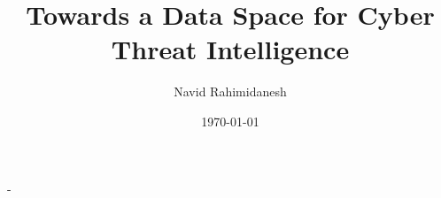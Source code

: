 \begin{titlingpage}
	\newlength{\logoheight}	\setlength{\logoheight}{5cm}
	\setlength{\droptitle}{-3em}
	
	\renewcommand{\maketitlehooka}{%
		\begin{center}
			{\Large  Rheinisch-Westfälische Technische Hochschule Aachen\par\noindent}
			 Informatik 5, Information Systems\\
			Prof. Dr. Stefan Decker\\
			\vspace*{2cm}
			{\LARGE\scshape Master Thesis}
			\vspace*{1.5em}
		\end{center}
	}
	\pretitle{\begin{center}\bfseries\HUGE\color{rwth-75}}
				\title{Towards a Data Space for Cyber Threat Intelligence}
	\posttitle{\end{center}\vskip 4em}
	
	\preauthor{\begin{center}\Large}
		\author{Navid Rahimidanesh}
	\postauthor{\end{center}\vskip 2em}
	
	\predate{\begin{center}\Large}
	\date{\today} %
	\postdate{\end{center}\vskip 2em}

    \renewcommand{\maketitlehookd}{%
    	\vfill
    \centerfloat
    \begin{tabular}{>{\sffamily\color{rwth}}r>{}l}
		\nth{1} Advisor			 &  Mehdi Akbari Gurabi, M.Sc.\\ %
		\nth{2} Advisor			 &  Ömer Sen, M.Sc.\\ %
    	\nth{1} Supervisor		& Prof. Dr. Stefan Decker \\%
    	\nth{2} Supervisor 		& Prof. Dr. Andreas Ulbig \\ %
    	
    \end{tabular}
	}
	\calccentering{\unitlength}
	\begin{adjustwidth*}{\unitlength}{-\unitlength}
		\maketitle
	\end{adjustwidth*}
\end{titlingpage}
